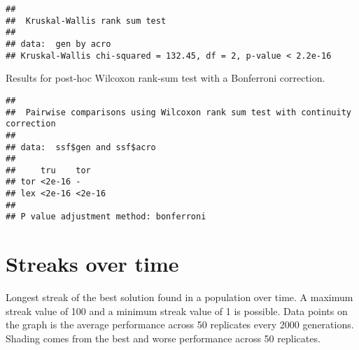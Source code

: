 \documentclass[]{book}
\newenvironment{Shaded}{\begin{snugshade}}{\end{snugshade}}
\newcommand{\DataTypeTok}[1]{\textcolor[rgb]{0.13,0.29,0.53}{#1}}
\newcommand{\KeywordTok}[1]{\textcolor[rgb]{0.13,0.29,0.53}{\textbf{#1}}}
\newcommand{\NormalTok}[1]{#1}
\newcommand{\OperatorTok}[1]{\textcolor[rgb]{0.81,0.36,0.00}{\textbf{#1}}}
\newcommand{\OtherTok}[1]{\textcolor[rgb]{0.56,0.35,0.01}{#1}}
\newcommand{\StringTok}[1]{\textcolor[rgb]{0.31,0.60,0.02}{#1}}
\begin{document}
\begin{verbatim}
## 
##  Kruskal-Wallis rank sum test
## 
## data:  gen by acro
## Kruskal-Wallis chi-squared = 132.45, df = 2, p-value < 2.2e-16
\end{verbatim}

Results for post-hoc Wilcoxon rank-sum test with a Bonferroni correction.

\begin{Shaded}
\end{Shaded}

\begin{verbatim}
## 
##  Pairwise comparisons using Wilcoxon rank sum test with continuity correction 
## 
## data:  ssf$gen and ssf$acro 
## 
##     tru    tor   
## tor <2e-16 -     
## lex <2e-16 <2e-16
## 
## P value adjustment method: bonferroni
\end{verbatim}

\hypertarget{streaks-over-time}{%
\section{Streaks over time}\label{streaks-over-time}}

Longest streak of the best solution found in a population over time.
A maximum streak value of 100 and a minimum streak value of 1 is possible.
Data points on the graph is the average performance across 50 replicates every 2000 generations.
Shading comes from the best and worse performance across 50 replicates.

\begin{Shaded}
\end{Shaded}
\end{document}
